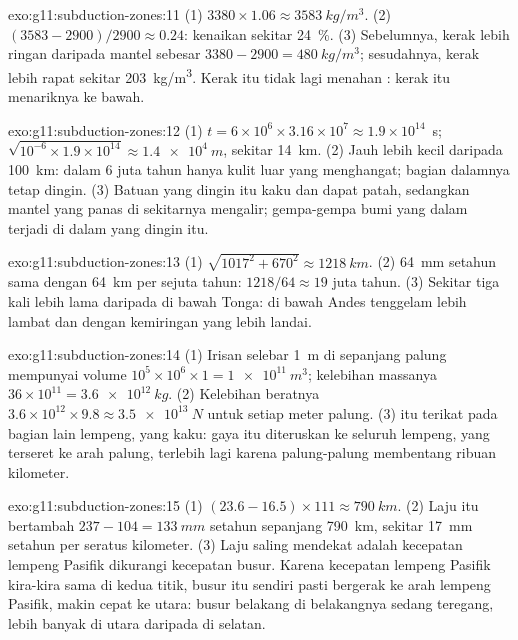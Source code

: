 \begin{solution}{exo:g11:subduction-zones:11}
(1) $3380 \times 1.06 \approx \qty{3583}{kg/m^3}$. (2)
$(3583 - 2900)/2900 \approx 0.24$: kenaikan sekitar \qty{24}{\percent}.
(3) Sebelumnya, kerak lebih ringan daripada mantel sebesar
$3380 - 2900 = \qty{480}{kg/m^3}$; sesudahnya, kerak lebih rapat sekitar
\qty{203}{kg/m^3}. Kerak itu tidak lagi menahan : kerak itu menariknya
ke bawah.
\end{solution}

\begin{solution}{exo:g11:subduction-zones:12}
(1) $t = 6 \times 10^6 \times 3.16 \times 10^7 \approx 1.9 \times 10^{14}$~s;
$\sqrt{10^{-6} \times 1.9 \times 10^{14}} \approx \qty{1.4e4}{m}$, sekitar
\qty{14}{km}. (2) Jauh lebih kecil daripada \qty{100}{km}: dalam 6 juta tahun
hanya kulit luar  yang menghangat; bagian dalamnya tetap dingin.
(3) Batuan yang dingin itu kaku dan dapat patah, sedangkan mantel yang panas di
sekitarnya mengalir; gempa-gempa bumi yang dalam terjadi di dalam  yang
dingin itu.
\end{solution}

\begin{solution}{exo:g11:subduction-zones:13}
(1) $\sqrt{1017^2 + 670^2} \approx \qty{1218}{km}$. (2) \qty{64}{mm} setahun
sama dengan \qty{64}{km} per sejuta tahun: $1218/64 \approx 19$ juta tahun.
(3) Sekitar tiga kali lebih lama daripada di bawah Tonga:  di bawah
Andes tenggelam lebih lambat dan dengan kemiringan yang lebih landai.
\end{solution}

\begin{solution}{exo:g11:subduction-zones:14}
(1) Irisan selebar \qty{1}{m} di sepanjang palung mempunyai volume
$10^5 \times 10^6 \times 1 = \qty{1e11}{m^3}$; kelebihan massanya
$36 \times 10^{11} = \qty{3.6e12}{kg}$. (2) Kelebihan beratnya
$3.6 \times 10^{12} \times 9.8 \approx \qty{3.5e13}{N}$ untuk setiap meter
palung. (3)  itu terikat pada bagian lain lempeng, yang kaku: gaya itu
diteruskan ke seluruh lempeng, yang terseret ke arah palung, terlebih lagi karena
palung-palung membentang ribuan kilometer.
\end{solution}

\begin{solution}{exo:g11:subduction-zones:15}
(1) $(23.6 - 16.5) \times 111 \approx \qty{790}{km}$. (2) Laju itu bertambah
$237 - 104 = \qty{133}{mm}$ setahun sepanjang \qty{790}{km}, sekitar
\qty{17}{mm} setahun per seratus kilometer. (3) Laju saling mendekat adalah
kecepatan lempeng Pasifik dikurangi kecepatan busur. Karena kecepatan lempeng
Pasifik kira-kira sama di kedua titik, busur itu sendiri pasti bergerak ke arah
lempeng Pasifik, makin cepat ke utara: busur belakang di belakangnya sedang
teregang, lebih banyak di utara daripada di selatan.
\end{solution}

